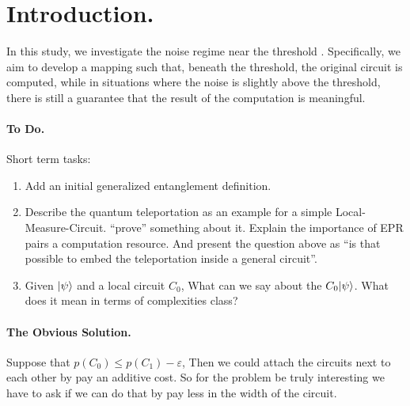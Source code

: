 \section{Introduction.}
In this study, we investigate the noise regime near the threshold \cite{aharonov1999faulttolerant}. Specifically, we aim to develop a mapping such that, beneath the threshold, the original circuit is computed, while in situations where the noise is slightly above the threshold, there is still a guarantee that the result of the computation is meaningful. 

 \paragraph{To Do.} Short term tasks:
 \begin{enumerate}
   \item Add an initial generalized entanglement definition.
   \item Describe the quantum teleportation as an example for a simple Local-Measure-Circuit. ``prove'' something about it. Explain the importance of EPR pairs a computation resource. And present the question above as ``is that possible to embed the teleportation inside a general circuit''.  
   \item Given ${\ket{\psi}}$ and a local circuit $C_{0}$, What can we say about the $C_{0}{\ket{\psi}}$. What does it mean in terms of complexities class?   
 \end{enumerate}





\paragraph{The Obvious Solution.} Suppose that $p(C_{0}) \le p(C_{1}) - \varepsilon$, Then we could attach the circuits next to each other by pay an additive cost. So for the problem be truly interesting we have to ask if we can do that by pay less in the width of the circuit. 


